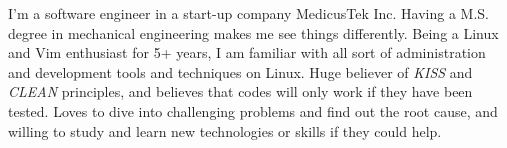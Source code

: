 

\begin{cvparagraph}

I'm a software engineer in a start-up company MedicusTek Inc. Having a M.S. degree in mechanical engineering makes me see things differently. Being a Linux and Vim enthusiast for 5+ years, I am familiar with all sort of administration and development tools and techniques on Linux. Huge believer of \textit{KISS} and \textit{CLEAN} principles, and believes that codes will only work if they have been tested. Loves to dive into challenging problems and find out the root cause, and willing to study and learn new technologies or skills if they could help.
\end{cvparagraph}
